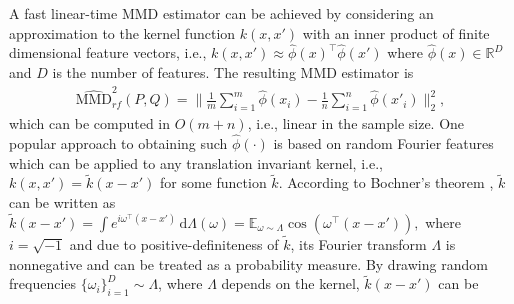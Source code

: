 \documentclass{article}
\begin{document}
A fast linear-time MMD estimator can be achieved by considering an
approximation to the kernel function $k(x,x')$ with an inner product
of finite dimensional feature vectors, i.e.,  $k(x,x')\approx \hat{\phi}(x)^{\top}\hat{\phi}(x')$
where $\hat{\phi}(x)\in\mathbb{R}^{D}$ and $D$ is the number of
features. 
The resulting MMD estimator is 
\begin{align}\label{eq:MMD_rf}
\widehat{\mathrm{MMD}}_{rf}^{2}(P,Q)=\bigg\|\tfrac{1}{m}\sum_{i=1}^{m}\hat{\phi}(x
_i)-\tfrac{1}{n}\sum_{i=1}^{n}\hat{\phi}(x'_i)\bigg\|_{2}^{2},  
\end{align}
which can be computed in $O(m+n)$, i.e., linear in the sample size. 
%
One popular
approach to obtaining such $\hat{\phi}(\cdot)$
is based on random Fourier
features \citep{rahimi2008random} which can be applied to any
translation invariant kernel, 
i.e., $k(x,x')=\tilde{k}(x-x')$ for some function $\tilde{k}$. According
to Bochner's theorem \citep{Rudin2013}, $\tilde{k}$ can be written
as
$
\tilde{k}(x-x') =\int e^{i\omega^{\top}(x-x')}\,\mathrm{d}\Lambda(\omega)
 =\mathbb{E}_{\omega\sim\Lambda}\cos(\omega^{\top}(x-x')),
$
%
where $i=\sqrt{-1}$ and due to positive-definiteness of $\tilde k$, its Fourier transform
$\Lambda$ is nonnegative and can be treated as a probability measure. By drawing
random frequencies $\{\omega_{i}\}_{i=1}^{D}\sim\Lambda$, where $\Lambda$ depends on the kernel,
$\tilde{k}(x-x')$ can be
\end{document}
